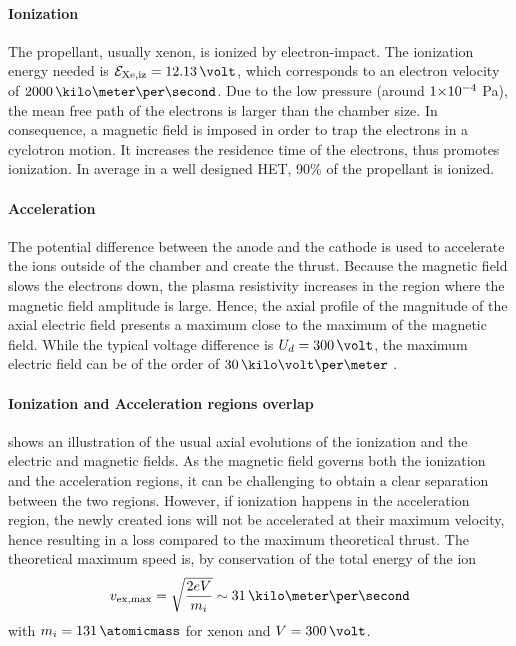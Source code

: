   \paragraph{Ionization\\}
  The propellant, usually xenon, is ionized by electron-impact.
  The ionization energy needed is $\mathcal{E}_{\rm Xe, iz} = 12.13 \,\volt$, which corresponds to an electron velocity of $2000\,\kilo\meter\per\second$.
  Due to the low pressure (around ${{1}{\times}10^{-4}}$ Pa), the mean free path of the electrons is larger than the chamber size.
  In consequence, a magnetic field is imposed in order to trap the electrons in a cyclotron motion.
  It increases the residence time of the electrons, thus promotes  ionization.
  In average in a well designed \ac{HET}, 90\% of the propellant is ionized.

  \paragraph{Acceleration\\}
  The potential difference  between the anode and the cathode is used to accelerate the ions outside of the chamber and create the thrust.
  Because the magnetic field slows the electrons down, the plasma resistivity increases in the region where the magnetic field amplitude is large.
  Hence, the axial profile of the magnitude of the axial electric field presents a maximum close to the maximum of the magnetic field.
  While the typical voltage difference is $U_d=300\,\volt$, the maximum electric field can be of the order of $30\,\kilo\volt\per\meter$ \citep{gawron2008}.

  \paragraph{Ionization and Acceleration regions overlap\\}
   shows an illustration of the usual axial evolutions of the ionization and the electric and magnetic fields.
  As the magnetic field governs both the ionization and the acceleration regions, it can be challenging to obtain a clear separation between the two regions.
  However, if ionization happens in the acceleration region, the newly created ions will not be accelerated at their maximum velocity, hence resulting in a loss compared to the maximum theoretical thrust.
  The theoretical maximum speed is, by conservation of the total energy of the ion
  \begin{equation} \label{eq-vmaxtheo}
    v_{\rm ex, max} = \sqrt{ \frac{2 e V}{m_i} } \sim 31 \,\kilo\meter\per\second
  \end{equation}
  with $m_i = 131 \,\atomicmass$ for xenon and $V=300\,\volt$.


